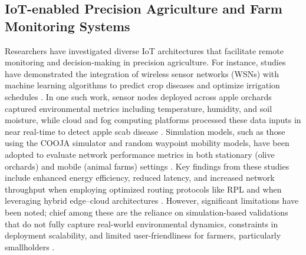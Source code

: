 \documentclass[12pt,onecolumn]{IEEEtran} %
\begin{document}
  \subsection{IoT-enabled Precision Agriculture and Farm Monitoring Systems}\label{subsec:lit-precision}
Researchers have investigated diverse IoT architectures that facilitate remote monitoring and decision-making in precision agriculture. For instance, studies have demonstrated the integration of wireless sensor networks (WSNs) with machine learning algorithms to predict crop diseases and optimize irrigation schedules \cite{dhanaraju2022smartfarminginternet, akhter2022precisionagricultureusing}. In one such work, sensor nodes deployed across apple orchards captured environmental metrics including temperature, humidity, and soil moisture, while cloud and fog computing platforms processed these data inputs in near real-time to detect apple scab disease \cite{akhter2022precisionagricultureusing}. Simulation models, such as those using the COOJA simulator and random waypoint mobility models, have been adopted to evaluate network performance metrics in both stationary (olive orchards) and mobile (animal farms) settings \cite{jaliyagoda2023internetofthings, atalla2023iotenabledprecisionagriculture}. Key findings from these studies include enhanced energy efficiency, reduced latency, and increased network throughput when employing optimized routing protocols like RPL and when leveraging hybrid edge–cloud architectures \cite{atalla2023iotenabledprecisionagriculture, atalla2023iotenabledprecisionagriculture}. However, significant limitations have been noted; chief among these are the reliance on simulation-based validations that do not fully capture real-world environmental dynamics, constraints in deployment scalability, and limited user-friendliness for farmers, particularly smallholders \cite{bayih2022utilizationofinternet, atalla2023iotenabledprecisionagriculture}.
\end{document}
